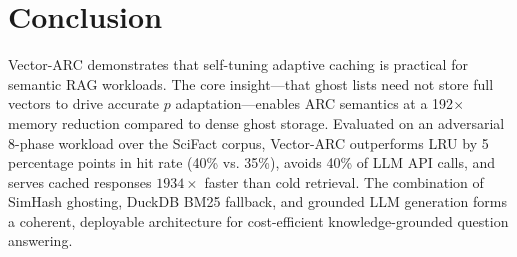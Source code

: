 \documentclass[conference,10pt]{IEEEtran}
\begin{document}
\newpage
\section{Conclusion}

Vector-ARC demonstrates that self-tuning adaptive caching is practical for semantic RAG workloads. The core insight—that ghost lists need not store full vectors to drive accurate $p$ adaptation—enables ARC semantics at a 192$\times$ memory reduction compared to dense ghost storage. Evaluated on an adversarial 8-phase workload over the SciFact corpus, Vector-ARC outperforms LRU by 5 percentage points in hit rate (40\% vs. 35\%), avoids 40\% of LLM API calls, and serves cached responses $1934\times$ faster than cold retrieval. The combination of SimHash ghosting, DuckDB BM25 fallback, and grounded LLM generation forms a coherent, deployable architecture for cost-efficient knowledge-grounded question answering.
\end{document}
